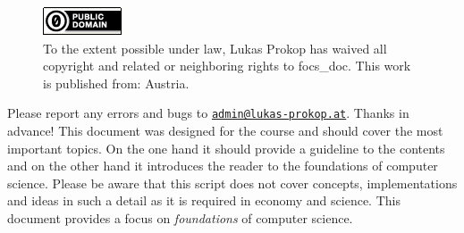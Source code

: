 \begin{titlepage}
  \begin{center}
    \begin{figure}[ht!]
      \begin{center}
        \includegraphics[width=88px,height=33px]{img/cc0.png} \\[20pt]
        To the extent possible under law, Lukas Prokop has waived all copyright and related 
        or neighboring rights to focs\_doc. This work is published from: Austria. 
      \end{center}
    \end{figure}
    \vspace{50pt}
    \noindent Please report any errors and bugs to
    \href{mailto:admin@lukas-prokop.at}{\nolinkurl{admin@lukas-prokop.at}}.
    Thanks in advance!
    \vspace{50pt}
    This document was designed for the course \courselfocs{} and should cover
    the most important topics. On the one hand it should provide a guideline
    to the contents and on the other hand it introduces the reader to the
    foundations of computer science. Please be aware that this script does
    not cover concepts, implementations and ideas in such a detail as it is
    required in economy and science. This document provides a focus on
    \emph{foundations} of computer science.
  \end{center}
\end{titlepage}


